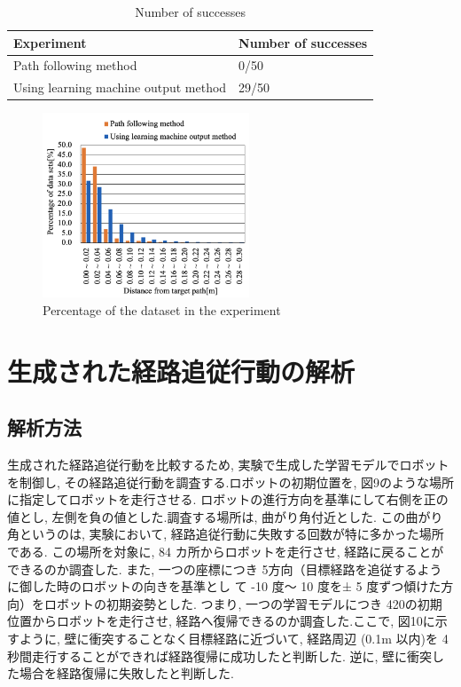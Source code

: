 \documentclass{jarticle}
\begin{document}
\begin{table}[htbp]
  \caption{Number of successes} \vspace*{2mm}\hspace*{-3mm}
    \begin{tabular}{|l|l|}
      \hline\hline
      Experiment & Number of successes \\
      \hline\hline
      Path following method & 0/50 \\
      Using learning machine output method & 29/50 \\
      \hline
    \end{tabular}
\end {table}


\begin{figure}[htbp]
  \centering
   \includegraphics[height=55mm]{./figs/data1.png}
   \caption{Percentage of the dataset in the experiment}
\end{figure}


\section{生成された経路追従行動の解析}
\subsection{解析方法}
生成された経路追従行動を比較するため, 実験で生成した学習モデルでロボットを制御し, 
その経路追従行動を調査する.ロボットの初期位置を,  図9のような場所に指定してロボットを走行させる.
ロボットの進行方向を基準にして右側を正の値とし, 左側を負の値とした.調査する場所は, 曲がり角付近とした. 
この曲がり角というのは, 実験において, 経路追従行動に失敗する回数が特に多かった場所である.
この場所を対象に,  84 カ所からロボットを走行させ, 経路に戻ることができるのか調査した.
また, 一つの座標につき 5方向（目標経路を追従するように御した時のロボットの向きを基準とし
て -10 度〜 10 度を± 5 度ずつ傾けた方向）をロボットの初期姿勢とした. 
つまり,  一つの学習モデルにつき 420の初期位置からロボットを走行させ, 
経路へ復帰できるのか調査した.ここで, 図10に示すように, 壁に衝突することなく目標経路に近づいて, 
経路周辺 (0.1m 以内)を 4秒間走行することができれば経路復帰に成功したと判断した.
逆に, 壁に衝突した場合を経路復帰に失敗したと判断した.
\end{document}
